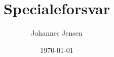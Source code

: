 \documentclass{beamer} %
\title{Specialeforsvar}
\author{Johannes Jensen}
\institute{Aarhus Universitet}
\date{\today}
\newcommand{\R}{\mathbb{R}}
\newcommand{\curly}[1]{\{#1\}}
\begin{document}
 
\frame{\titlepage}

\end{document}
